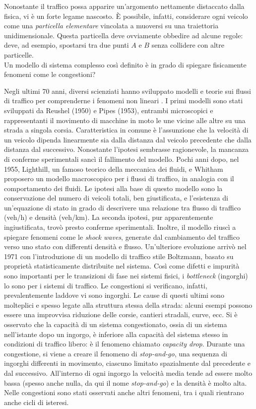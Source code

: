 \documentclass[../main.tex]{subfiles}
\begin{document}
Nonostante il traffico possa apparire un'argomento nettamente distaccato dalla fisica, vi \`e un forte legame nascosto.
\`E possibile, infatti, considerare ogni veicolo come una \emph{particella elementare} vincolata a muoversi su una traiettoria unidimensionale.
Questa particella deve ovviamente obbedire ad alcune regole: deve, ad esempio, spostarsi tra due punti $A$ e $B$ senza collidere con altre particelle.\\
Un modello di sistema complesso cos\`i definito \`e in grado di spiegare fisicamente fenomeni come le congestioni?

Negli ultimi 70 anni, diversi scienziati hanno sviluppato modelli e teorie sui flussi di traffico per comprenderne i fenomeni non lineari \cite{bs2004physics}.
I primi modelli sono stati sviluppati da Reushel (1950) e Pipes (1953), entrambi microscopici e rappresentanti il movimento di macchine in moto le une vicine alle altre su una strada a singola corsia.
Caratteristica in comune \`e l'assunzione che la velocit\`a di un veicolo dipenda linearmente sia dalla distanza dal veicolo precedente che dalla distanza dal successivo.
Nonostante l'ipotesi sembrasse ragionevole, la mancanza di conferme sperimentali sanc\`i il fallimento del modello.
Pochi anni dopo, nel 1955, Lighthill, un famoso teorico della meccanica dei fluidi, e Whitham proposero un modello macroscopico per i flussi di traffico, in analogia con il comportamento dei fluidi.
Le ipotesi alla base di questo modello sono la conservazione del numero di veicoli totali, ben giustificata, e l'esistenza di un'equazione di stato in grado di descrivere una relazione tra flusso di traffico (veh/h) e densit\`a (veh/km).
La seconda ipotesi, pur apparentemente ingiustificata, trov\`o presto conferme sperimentali.
Inoltre, il modello riusc\`i a spiegare fenomeni come le \emph{shock waves}, generate dal cambiamento del traffico verso uno stato con differenti densit\`a e flusso.
Un'ulteriore evoluzione arriv\`o nel 1971 con l'introduzione di un modello di traffico stile Boltzmann, basato su propriet\`a statisticamente distribuite nel sistema.
Cos\`i come difetti e impurit\`a sono importanti per le transizioni di fase nei sistemi fisici, i \emph{bottleneck} (ingorghi) lo sono per i sistemi di traffico.
Le congestioni si verificano, infatti, prevalentemente laddove vi sono ingorghi.
Le cause di questi ultimi sono molteplici e spesso legate alla struttura stessa della strada: alcuni esempi possono essere una improvvisa riduzione delle corsie, cantieri stradali, curve, ecc.
Si \`e osservato che la capacit\`a di un sistema congestionato, ossia di un sistema nell'istante dopo un ingorgo, \`e inferiore alla capacit\`a del sistema stesso in condizioni di traffico libero: \`e il fenomeno chiamato \emph{capacity drop}.
Durante una congestione, si viene a creare il fenomeno di \emph{stop-and-go}, una sequenza di ingorghi differenti in movimento, ciascuno limitato spazialmente dal precedente e dal successivo.
All'interno di ogni ingorgo la velocit\`a media tende ad essere molto bassa (spesso anche nulla, da qui il nome \emph{stop-and-go}) e la densit\`a \`e molto alta.
Nelle congestioni sono stati osservati anche altri fenomeni, tra i quali rientrano anche cicli di isteresi.
\end{document}
